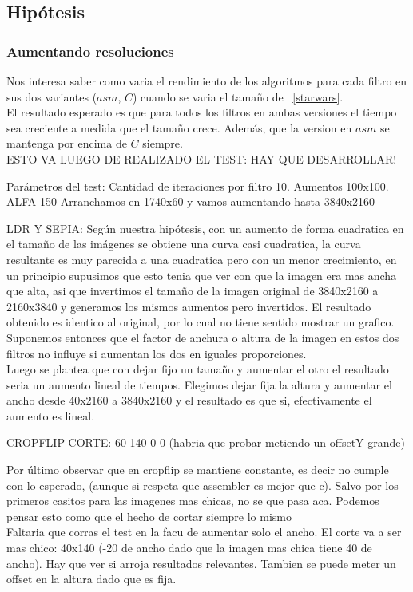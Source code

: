 \pagebreak

\subsection{Hipótesis}


\subsubsection{Aumentando resoluciones}

Nos interesa saber como varia el rendimiento de los algoritmos para cada filtro en sus dos variantes ($asm$, $C$) cuando se varia el tamaño de ~\ref{starwars}.\\

El resultado esperado es que para todos los filtros en ambas versiones el tiempo sea creciente a medida que el tamaño crece. Además, que la version en $asm$ se mantenga por encima de $C$ siempre. \\ 

ESTO VA LUEGO DE REALIZADO EL TEST: HAY QUE DESARROLLAR!

Parámetros del test: 
Cantidad de iteraciones por filtro 10. Aumentos 100x100.
ALFA 150
Arranchamos en 1740x60 y vamos aumentando hasta 3840x2160

LDR Y SEPIA: 
Según nuestra hipótesis, con un aumento de forma cuadratica en el tamaño de las imágenes se obtiene una curva casi cuadratica, la curva resultante es muy parecida a una cuadratica pero con un menor crecimiento, en un principio supusimos que esto tenia que ver con que la imagen era mas ancha que alta, asi que invertimos el tamaño de la imagen original de 3840x2160 a 2160x3840 y generamos los mismos aumentos pero invertidos. El resultado obtenido es identico al original, por lo cual no tiene sentido mostrar un grafico. Suponemos entonces que el factor de anchura o altura de la imagen en estos dos filtros no influye si aumentan los dos en iguales proporciones. \\

Luego se plantea que con dejar fijo un tamaño y aumentar el otro el resultado seria un aumento lineal de tiempos. Elegimos dejar fija la altura y aumentar el ancho desde 40x2160 a 3840x2160 y el resultado es que si, efectivamente el aumento es lineal. 

CROPFLIP
CORTE: 60 140 0 0 (habria que probar metiendo un offsetY grande)

Por último observar que en cropflip se mantiene constante, es decir no cumple con lo esperado, (aunque si respeta que assembler es mejor que c). Salvo por los primeros casitos para las imagenes mas chicas, no se que pasa aca. Podemos pensar esto como que 
el hecho de cortar siempre lo mismo \\
Faltaria que corras el test en la facu de aumentar solo el ancho. El corte va a ser mas chico: 40x140 (-20 de ancho dado que la imagen mas chica tiene 40 de ancho). Hay que ver si arroja resultados relevantes. Tambien se puede meter un offset en la altura dado que es fija. 

